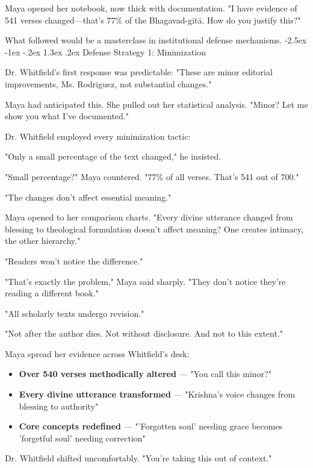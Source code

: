 \documentclass[12pt,twoside]{book}
\makeatletter
\renewcommand\section{\@startsection{section}{1}{\z@}%
{-2.5ex \@plus -1ex \@minus -.2ex}%
{1.3ex \@plus.2ex}%
{\normalfont\Large\bfseries}}
\makeatother
\begin{document}
Maya opened her notebook, now thick with documentation. "I have evidence of 541 verses changed—that's 77\% of the Bhagavad-gītā. How do you justify this?"

What followed would be a masterclass in institutional defense mechanisms.
\section{Defense Strategy 1: Minimization}
\label{sec:org51d4263}

Dr. Whitfield's first response was predictable: "These are minor editorial improvements, Ms. Rodriguez, not substantial changes."

Maya had anticipated this. She pulled out her statistical analysis. "Minor? Let me show you what I've documented."

Dr. Whitfield employed every minimization tactic:

"Only a small percentage of the text changed," he insisted.

"Small percentage?" Maya countered. "77\% of all verses. That's 541 out of 700."

"The changes don't affect essential meaning."

Maya opened to her comparison charts. "Every divine utterance changed from blessing to theological formulation doesn't affect meaning? One creates intimacy, the other hierarchy."

"Readers won't notice the difference."

"That's exactly the problem," Maya said sharply. "They don't notice they're reading a different book."

"All scholarly texts undergo revision."

"Not after the author dies. Not without disclosure. And not to this extent."

Maya spread her evidence across Whitfield's desk:

\begin{itemize}
\item \textbf{\textbf{Over 540 verses methodically altered}} — "You call this minor?"
\item \textbf{\textbf{Every divine utterance transformed}} — "Krishna's voice changes from blessing to authority"
\item \textbf{\textbf{Core concepts redefined}} — "'Forgotten soul' needing grace becomes 'forgetful soul' needing correction"
\end{itemize}

Dr. Whitfield shifted uncomfortably. "You're taking this out of context."
\end{document}
